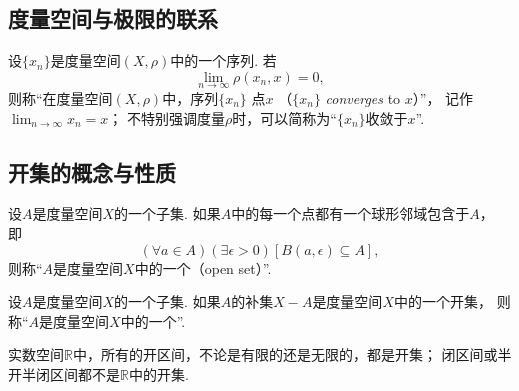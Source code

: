 \subsection{度量空间与极限的联系}
\begin{definition}
设\(\{x_n\}\)是度量空间\((X,\rho)\)中的一个序列.
若\begin{equation*}
	\lim_{n\to\infty} \rho(x_n,x) = 0,
\end{equation*}
则称“在度量空间\((X,\rho)\)中，序列\(\{x_n\}\)  点\(x\)%
（\(\{x_n\}\) \emph{converges} to \(x\)）”，
记作\(\lim_{n\to\infty} x_n = x\)；
不特别强调度量\(\rho\)时，可以简称为“\(\{x_n\}\)收敛于\(x\)”.
\end{definition}

\subsection{开集的概念与性质}
\begin{definition}\label{definition:度量空间.开集的概念}
设\(A\)是度量空间\(X\)的一个子集.
如果\(A\)中的每一个点都有一个球形邻域包含于\(A\)，
即\begin{equation*}
	(\forall a \in A)
	(\exists\epsilon>0)
	[B(a,\epsilon) \subseteq A],
\end{equation*}
则称“\(A\)是度量空间\(X\)中的一个（open set）”.
\end{definition}

\begin{definition}
设\(A\)是度量空间\(X\)的一个子集.
如果\(A\)的补集\(X-A\)是度量空间\(X\)中的一个开集，
则称“\(A\)是度量空间\(X\)中的一个”.
\end{definition}

\begin{example}
实数空间\(\mathbb{R}\)中，所有的开区间，不论是有限的还是无限的，都是开集；
闭区间或半开半闭区间都不是\(\mathbb{R}\)中的开集.
\end{example}


